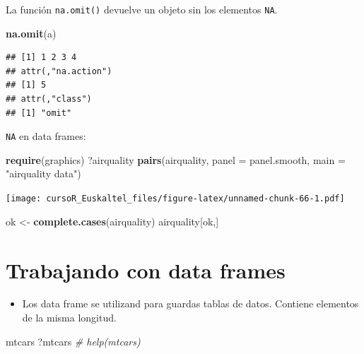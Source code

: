 \documentclass[]{book}
\newenvironment{Shaded}{\begin{snugshade}}{\end{snugshade}}
\newcommand{\KeywordTok}[1]{\textcolor[rgb]{0.13,0.29,0.53}{\textbf{#1}}}
\newcommand{\DataTypeTok}[1]{\textcolor[rgb]{0.13,0.29,0.53}{#1}}
\newcommand{\StringTok}[1]{\textcolor[rgb]{0.31,0.60,0.02}{#1}}
\newcommand{\CommentTok}[1]{\textcolor[rgb]{0.56,0.35,0.01}{\textit{#1}}}
\newcommand{\NormalTok}[1]{#1}
\providecommand{\tightlist}{%
  \setlength{\itemsep}{0pt}\setlength{\parskip}{0pt}}
\begin{document}
La función \texttt{na.omit()} devuelve un objeto sin los elementos
\texttt{NA}.

\begin{Shaded}
\begin{Highlighting}[]
\KeywordTok{na.omit}\NormalTok{(a) }
\end{Highlighting}
\end{Shaded}

\begin{verbatim}
## [1] 1 2 3 4
## attr(,"na.action")
## [1] 5
## attr(,"class")
## [1] "omit"
\end{verbatim}

\texttt{NA} en data frames:

\begin{Shaded}
\begin{Highlighting}[]
\KeywordTok{require}\NormalTok{(graphics)}
\NormalTok{?airquality}
\KeywordTok{pairs}\NormalTok{(airquality, }\DataTypeTok{panel =}\NormalTok{ panel.smooth, }\DataTypeTok{main =} \StringTok{"airquality data"}\NormalTok{)}
\end{Highlighting}
\end{Shaded}

\texttt{[image: cursoR\_Euskaltel\_files/figure-latex/unnamed-chunk-66-1.pdf]}

\begin{Shaded}
\begin{Highlighting}[]
\NormalTok{ok <-}\StringTok{ }\KeywordTok{complete.cases}\NormalTok{(airquality)}
\NormalTok{airquality[ok,]}
\end{Highlighting}
\end{Shaded}

\section{Trabajando con data frames}\label{trabajando-con-data-frames-1}

\begin{itemize}
\tightlist
\item
  Los data frame se utilizand para guardas tablas de datos. Contiene
  elementos de la misma longitud.
\end{itemize}

\begin{Shaded}
\begin{Highlighting}[]
\NormalTok{mtcars}
\NormalTok{?mtcars       }\CommentTok{# help(mtcars)}
\end{Highlighting}
\end{Shaded}
\end{document}
